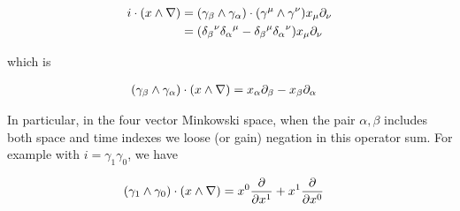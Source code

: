 \begin{align*}
i \cdot (x \wedge \nabla)
&=
(\gamma_\beta \wedge \gamma_\alpha) \cdot (\gamma^\mu  \wedge \gamma^\nu) x_\mu \partial_\nu \\
&=
({\delta_\beta}^\nu {\delta_\alpha}^\mu - {\delta_\beta}^\mu {\delta_\alpha}^\nu ) x_\mu \partial_\nu \\
\end{align*}

which is

\begin{align}\label{eqn:rotationGen:foo40}
(\gamma_\beta \wedge \gamma_\alpha) \cdot (x \wedge \nabla) &= x_\alpha \partial_\beta -x_\beta \partial_\alpha 
\end{align}

In particular, in the four vector Minkowski space, when the pair $\alpha,\beta$ includes both space and time indexes we loose (or gain) negation in this operator sum. For example with $i = \gamma_1 \gamma_0$, we have

\begin{align}\label{eqn:rotationGen:foo41}
(\gamma_1 \wedge \gamma_0) \cdot (x \wedge \nabla) 
&= x^0 \frac{\partial}{\partial x^1} + x^1 \frac{\partial}{\partial x^0}
\end{align}

\EndArticle
